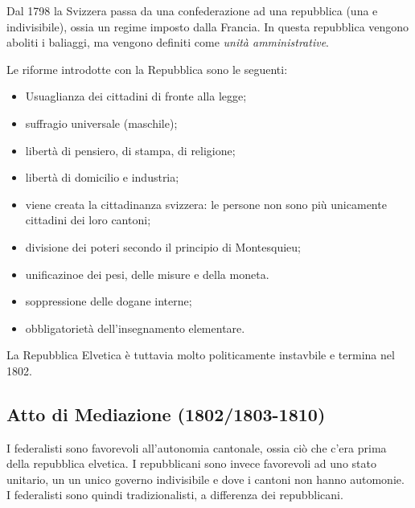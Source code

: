 \documentclass[a4paper]{article}
\begin{document}
Dal 1798 la Svizzera passa da una confederazione ad una repubblica (una e indivisibile),
ossia un regime imposto dalla Francia.
In questa repubblica vengono aboliti i baliaggi, ma vengono definiti come \textit{unità amministrative}.


\pagebreak

Le riforme introdotte con la Repubblica sono le seguenti:
\begin{itemize}
    \item Usuaglianza dei cittadini di fronte alla legge;
    \item suffragio universale (maschile);
    \item libertà di pensiero, di stampa, di religione;
    \item libertà di domicilio e industria;
    \item viene creata la cittadinanza svizzera: le persone non sono più unicamente cittadini dei loro cantoni;
    \item divisione dei poteri secondo il principio di Montesquieu;
    \item unificazinoe dei pesi, delle misure e della moneta.
    \item soppressione delle dogane interne;
    \item obbligatorietà dell'insegnamento elementare.
\end{itemize}

La Repubblica Elvetica è tuttavia molto politicamente instavbile e termina nel 1802.

\subsection{Atto di Mediazione (1802/1803-1810)}

\begin{center}
\end{center}

I federalisti sono favorevoli all'autonomia cantonale, ossia ciò che c'era prima della repubblica elvetica.
I repubblicani sono invece favorevoli ad uno stato unitario, un un unico governo indivisibile e dove i cantoni non hanno automonie.
I federalisti sono quindi tradizionalisti, a differenza dei repubblicani.
\end{document}
